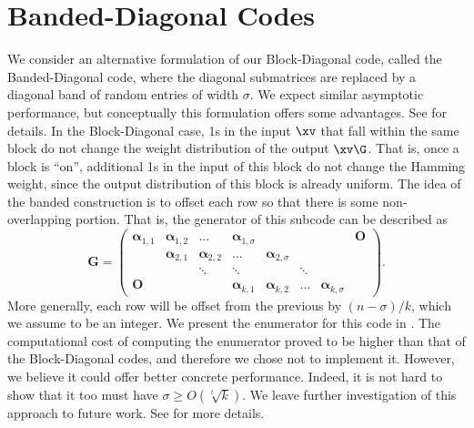 

\section{Banded-Diagonal Codes}\label{sec:banded}

We consider an alternative formulation of our Block-Diagonal code, called the Banded-Diagonal code, where the diagonal submatrices are replaced by a diagonal band of random entries of width $\sigma$. We expect similar asymptotic performance, but conceptually this formulation offers some advantages. See  for details.
  \if{}
  \else
 In the Block-Diagonal case, 1s in the input $\xv$ that fall within the same block do not change the weight distribution of the output $\xv\G$. That is, once a block is ``on'', additional 1s in the input \xv of this block do not change the Hamming weight, since the output distribution of this block is already uniform. The idea of the banded construction is to offset each row so that there is some non-overlapping portion. That is, the generator of this subcode can be described as
$$
    \mathbf{G} = \left(\begin{matrix}
    \mathbf{\alpha}_{1,1}&\mathbf{\alpha}_{1,2}& ...  & \mathbf{\alpha}_{1,\sigma}& & &&\mathbf{O}\\
    &\mathbf{\alpha}_{2,1}& \mathbf{\alpha}_{2,2}&...  & \mathbf{\alpha}_{2,\sigma}&  &&\\
     &  &\ddots&\ddots&&\ddots&&\\
   \mathbf{O} &  &&\mathbf{\alpha}_{k,1} &\mathbf{\alpha}_{k,2}&...  & \mathbf{\alpha}_{k,\sigma}
   \end{matrix}\right).
$$
More generally, each row will be offset from the previous by $(n-\sigma)/k$, which we assume to be an integer. We present the enumerator for this code in . The computational cost of computing the enumerator proved to be higher than that of the Block-Diagonal codes, and therefore we chose not to implement it. However, we believe it could offer better concrete performance. Indeed, it is not hard to show that it too must have $\sigma\geq O(\sqrt[t]{k})$. We leave further investigation of this approach to future work. See  for more details.
\fi